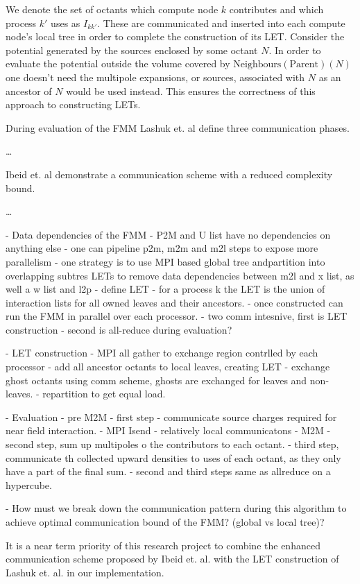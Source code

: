 We denote the set of octants which compute node $k$ contributes and which process $k'$ uses as $I_{k k'}$. These are communicated and inserted into each compute node's local tree in order to complete the construction of its LET. Consider the potential generated by the sources enclosed by some octant $N$. In order to evaluate the potential outside the volume covered by $\text{Neighbours}(\text{Parent})(N)$ one doesn't need the multipole expansions, or sources, associated with $N$ as an ancestor of $N$ would be used instead. This ensures the correctness of this approach to constructing LETs.

During evaluation of the FMM Lashuk et. al define three communication phases.

\dots

Ibeid et. al demonstrate a communication scheme with a reduced complexity bound.

\dots



- Data dependencies of the FMM  - P2M and U list have no dependencies on anything else
    - one can pipeline p2m, m2m and m2l steps to expose more parallelism
    - one strategy is to use MPI based global tree andpartition into overlapping subtres LETs to remove data dependencies between m2l and x list, as well a w list and l2p
    - define LET
        - for a process k the LET is the union of interaction lists for all owned leaves and their ancestors.
        - once constructed can run the FMM in parallel over each processor.
            - two comm intesnive, first is LET construction
            - second is all-reduce during evaluation?

    - LET construction
        - MPI all gather to exchange region contrlled by each processor
        - add all ancestor octants to local leaves, creating LET
        - exchange ghost octants using comm scheme, ghosts are exchanged for leaves and non-leaves.
        - repartition to get equal load.

    - Evaluation
        - pre M2M
            - first step
            - communicate source charges required for near field interaction.
                - MPI Isend - relatively local communicatons
        - M2M
            - second step, sum up multipoles o the contributors to each octant.
            - third step, communicate th collected upward densities to uses of each octant, as they only have a part of the final sum.
        - second and third steps same as allreduce  on a hypercube.

- How must we break down the communication pattern during this algorithm to achieve optimal communication bound of the FMM? (global vs local tree)?


It is a near term priority of this research project to combine the enhanced communication scheme proposed by Ibeid et. al. with the LET construction of Lashuk et. al. in our implementation.

